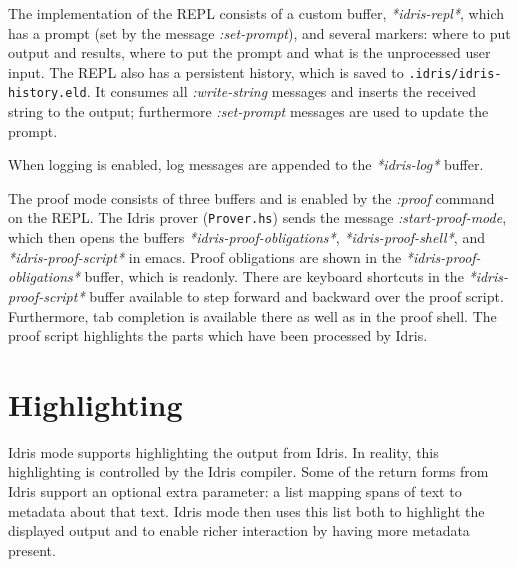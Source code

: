 \documentclass{article}
\begin{document}
The implementation of the REPL consists of a custom buffer, \emph{*idris-repl*}, which has a prompt (set by the message \emph{:set-prompt}), and several markers: where to put output and results, where to put the prompt and what is the unprocessed user input.
The REPL also has a persistent history, which is saved to \texttt{.idris/idris-history.eld}.
It consumes all \emph{:write-string} messages and inserts the received string to the output; furthermore \emph{:set-prompt} messages are used to update the prompt.

When logging is enabled, log messages are appended to the \emph{*idris-log*} buffer.

The proof mode consists of three buffers and is enabled by the \emph{:proof} command on the REPL.
The Idris prover (\texttt{Prover.hs}) sends the message \emph{:start-proof-mode}, which then opens the buffers \emph{*idris-proof-obligations*}, \emph{*idris-proof-shell*}, and \emph{*idris-proof-script*} in emacs.
Proof obligations are shown in the \emph{*idris-proof-obligations*} buffer, which is readonly.
There are keyboard shortcuts in the \emph{*idris-proof-script*} buffer available to step forward and backward over the proof script.
Furthermore, tab completion is available there as well as in the proof shell.
The proof script highlights the parts which have been processed by Idris.

\section{Highlighting}
Idris mode supports highlighting the output from Idris.
In reality, this highlighting is controlled by the Idris compiler.
Some of the return forms from Idris support an optional extra parameter: a list mapping spans of text to metadata about that text.
Idris mode then uses this list both to highlight the displayed output and to enable richer interaction by having more metadata present.
\end{document}

